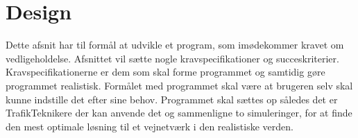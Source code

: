\chapter{Design}
Dette afsnit har til formål at udvikle et program, som imødekommer kravet om vedligeholdelse. Afsnittet vil sætte nogle kravspecifikationer og succeskriterier. Kravspecifikationerne er dem som skal forme programmet og samtidig gøre programmet realistisk. Formålet med programmet skal være at brugeren selv skal kunne indstille det efter sine behov. Programmet skal sættes op således det er TrafikTeknikere der kan anvende det og sammenligne to simuleringer, for at finde den mest optimale løsning til et vejnetværk i den realistiske verden. 

